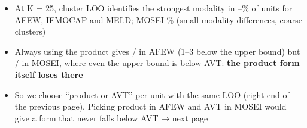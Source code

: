 \begin{frame}{}
{\begin{itemize}
\end{itemize}
}{%
\begin{itemize}
\item At K = 25, cluster LOO identifies the strongest modality in --\% of units for AFEW, IEMOCAP and MELD; MOSEI \% (small modality differences, coarse clusters)
\item Always using the product gives  /  in AFEW (1--3 below the upper bound) but  /  in MOSEI, where even the upper bound is below AVT: \textbf{the product form itself loses there}
\item So we choose ``product or AVT'' per unit with the same LOO (right end of the previous page). Picking product in AFEW and AVT in MOSEI would give a form that never falls below AVT → next page
\end{itemize}
}
\end{frame}

